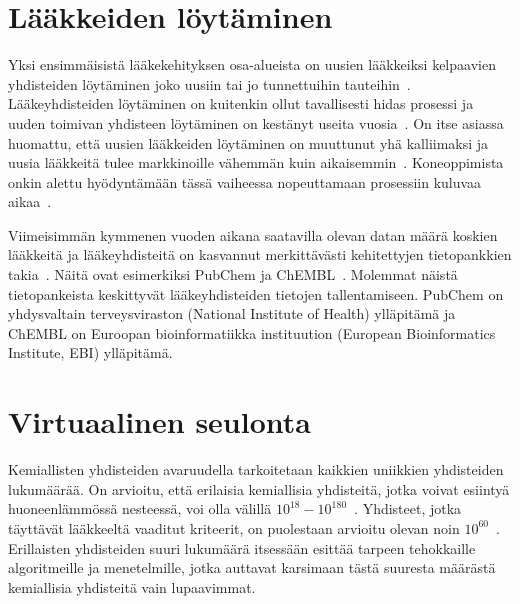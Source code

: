 \documentclass[finnish,twoside,censored,tkt,sw-line]{HYthesisML}
\begin{document}
\section{Lääkkeiden löytäminen}

Yksi ensimmäisistä lääkekehityksen osa-alueista on uusien lääkkeiksi kelpaavien yhdisteiden löytäminen joko uusiin tai jo tunnettuihin tauteihin~\cite{EkinsSean2019Emlf}.
Lääkeyhdisteiden löytäminen on kuitenkin ollut tavallisesti hidas prosessi ja uuden toimivan yhdisteen löytäminen on kestänyt useita vuosia~\cite{EkinsSean2019Emlf,MunosBernardH2011Htrb}.
On itse asiassa huomattu, että uusien lääkkeiden löytäminen on muuttunut yhä kalliimaksi ja uusia lääkkeitä tulee markkinoille vähemmän kuin aikaisemmin~\cite{MunosBernardH2011Htrb}.
Koneoppimista onkin alettu hyödyntämään tässä vaiheessa nopeuttamaan prosessiin kuluvaa aikaa~\cite{VamathevanJessica2019Aoml}.

Viimeisimmän kymmenen vuoden aikana saatavilla olevan datan määrä koskien lääkkeitä ja lääkeyhdisteitä on kasvannut merkittävästi kehitettyjen tietopankkien takia~\cite{EkinsSean2019Emlf}.
Näitä ovat esimerkiksi PubChem ja ChEMBL~\cite{NationalCenterForBiotechnologyInformation,chembl}.
Molemmat näistä tietopankeista keskittyvät lääkeyhdisteiden tietojen tallentamiseen.
PubChem on yhdysvaltain terveysviraston (National Institute of Health) ylläpitämä ja ChEMBL on Euroopan bioinformatiikka instituution (European Bioinformatics Institute, EBI) ylläpitämä.



\section{Virtuaalinen seulonta}

Kemiallisten yhdisteiden avaruudella tarkoitetaan kaikkien uniikkien yhdisteiden lukumäärää.
On arvioitu, että erilaisia kemiallisia yhdisteitä, jotka voivat esiintyä huoneenlämmössä nesteessä, voi olla välillä \(10^{18} - 10^{180}\)~\cite{SotrifferChristoph2011VSPC}.
Yhdisteet, jotka täyttävät lääkkeeltä vaaditut kriteerit, on puolestaan arvioitu olevan noin \(10^{60}\)~\cite{SotrifferChristoph2011VSPC}.
Erillaisten yhdisteiden suuri lukumäärä itsessään esittää tarpeen tehokkaille algoritmeille ja menetelmille, jotka auttavat karsimaan tästä suuresta määrästä kemiallisia yhdisteitä vain lupaavimmat.
\end{document}
